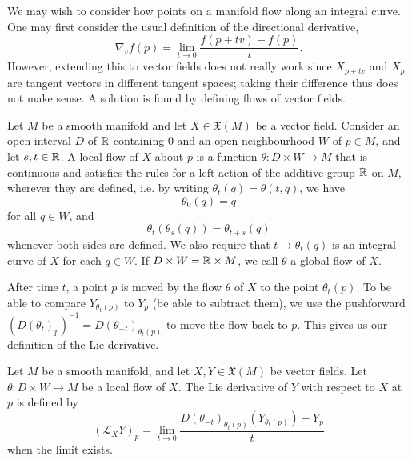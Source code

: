 \documentclass[a4paper,12pt]{article}
\begin{document}
We may wish to consider how points on a manifold flow along an integral curve.
One may first consider the usual definition of the directional derivative,
\begin{equation}
    \nabla_v f(p) = \lim_{t \to 0} \frac{f(p + tv) - f(p)}{t}.
\end{equation}
However, extending this to vector fields does not really work since $X_{p+tv}$ and $X_p$ are tangent vectors in different tangent spaces; taking their difference thus does not make sense.
A solution is found by defining flows of vector fields.
\begin{definition}[Flow]\label{def:flow}
    Let $M$ be a smooth manifold and let $X \in \mathfrak{X}(M)$ be a vector field.
    Consider an open interval $D$ of $\mathbb{R}$ containing $0$ and an open neighbourhood $W$ of $p \in M$, and let $s, t \in \mathbb{R}$.
    A local flow of $X$ about $p$ is a function $\theta \colon D \times W \to M$ that is continuous and satisfies the rules for a left action of the additive group $\mathbb{R}$ on $M$, wherever they are defined, i.e. by writing $\theta_t(q) = \theta(t, q)$, we have
    \begin{equation}
        \theta_0(q) = q
    \end{equation}
    for all $q \in W$, and
    \begin{equation}
        \theta_t(\theta_s(q)) = \theta_{t+s}(q)
    \end{equation}
    whenever both sides are defined.
    We also require that $t \mapsto \theta_t(q)$ is an integral curve of $X$ for each $q \in W$.
    If $D \times W = \mathbb{R} \times M$, we call $\theta$ a global flow of $X$.
\end{definition}
After time $t$, a point $p$ is moved by the flow $\theta$ of $X$ to the point $\theta_t(p)$.
To be able to compare $Y_{\theta_t(p)}$ to $Y_p$ (be able to subtract them), we use the pushforward $(D(\theta_t)_p)^{-1} = D(\theta_{-t})_{\theta_t(p)}$ to move the flow back to $p$.
This gives us our definition of the Lie derivative.
\begin{definition}\label{def:lie_derivative_of_vector_field}
    Let $M$ be a smooth manifold, and let $X, Y \in \mathfrak{X}(M)$ be vector fields.
    Let $\theta \colon D \times W \to M$ be a local flow of $X$.
    The Lie derivative of $Y$ with respect to $X$ at $p$ is defined by
    \begin{equation}
        (\mathcal{L}_X Y)_p = \lim_{t \to 0} \frac{D(\theta_{-t})_{\theta_t(p)}(Y_{\theta_t(p)}) - Y_p}{t}
    \end{equation}
    when the limit exists.
\end{definition}
\end{document}
